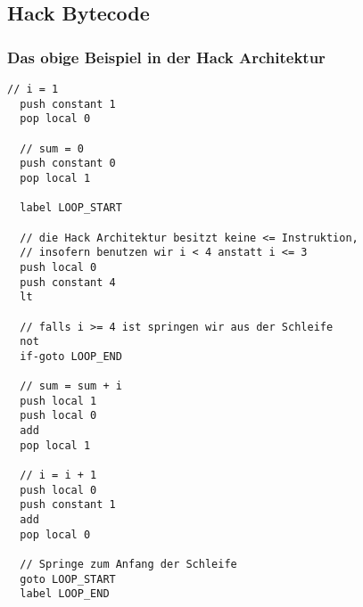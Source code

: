 \subsection{Hack Bytecode}
\subsubsection{Das obige Beispiel in der Hack Architektur}
\begin{lstlisting}[caption={Berechne 1 + 2 + 3 in der Hack VM}, captionpos=b]
  // i = 1
  push constant 1
  pop local 0

  // sum = 0
  push constant 0
  pop local 1

  label LOOP_START

  // die Hack Architektur besitzt keine <= Instruktion,
  // insofern benutzen wir i < 4 anstatt i <= 3
  push local 0
  push constant 4
  lt

  // falls i >= 4 ist springen wir aus der Schleife
  not
  if-goto LOOP_END

  // sum = sum + i
  push local 1
  push local 0
  add
  pop local 1

  // i = i + 1
  push local 0
  push constant 1
  add
  pop local 0

  // Springe zum Anfang der Schleife
  goto LOOP_START
  label LOOP_END
\end{lstlisting}
